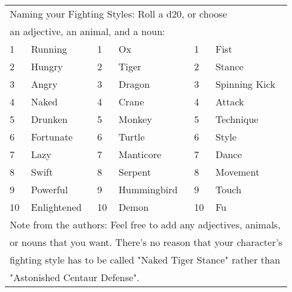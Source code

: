 \begin{table}[tbh]
\begin{small}
\begin{center}
\noindent \begin{tabular}{|ll||ll||ll|}
\multicolumn{6}{l}{Naming your Fighting Styles: Roll a d20, or choose}\\
\multicolumn{6}{l}{an adjective, an animal, and a noun:} \\
\hline 1&Running&1&Ox&1&Fist\\
2&Hungry&2&Tiger&2&Stance\\
3&Angry&3&Dragon&3&Spinning Kick\\
4&Naked&4&Crane&4&Attack\\
5&Drunken&5&Monkey&5&Technique\\
6&Fortunate&6&Turtle&6&Style\\
7&Lazy&7&Manticore&7&Dance\\
8&Swift&8&Serpent&8&Movement\\
9&Powerful&9&Hummingbird&9&Touch\\
10&Enlightened&10&Demon&10&Fu\\ \hline
\multicolumn{6}{l}{Note from the authors: Feel free to add any adjectives, animals,}\\
\multicolumn{6}{l}{or nouns that you want.  There's no reason that your character's}\\
\multicolumn{6}{l}{fighting style has to be called "Naked Tiger Stance" rather than}\\
\multicolumn{6}{l}{"Astonished Centaur Defense".}\\
\end{tabular}
\end{center}
\end{small}
\end{table}



